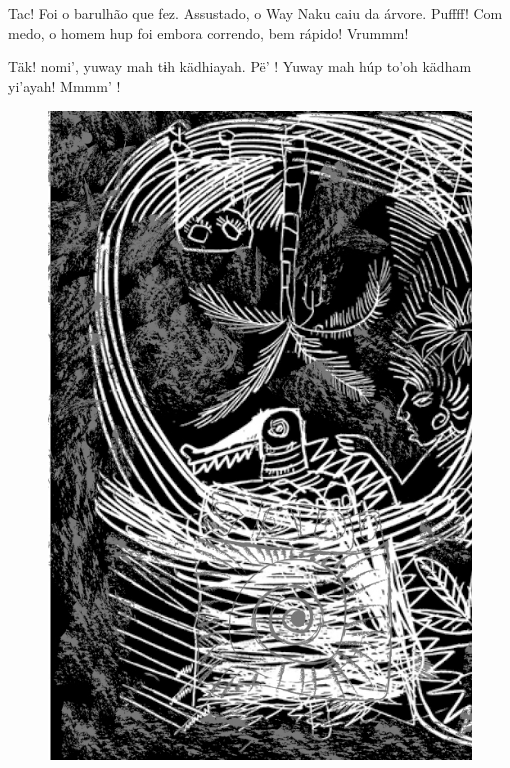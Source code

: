 \chapter*{}

\mbox{}\vspace*{\fill}

Tac! Foi o barulhão
que fez. Assustado,
o Way Naku caiu da
árvore. Puffff!
Com medo, o homem
hup foi embora
correndo, bem
rápido! Vrummm!

\bigskip

Täk! nomi’, yuway
mah tɨh kädhiayah.
Pë’ ! Yuway mah
húp to’oh kädham
yi’ayah! Mmmm’ !

\vspace*{\fill}

\begin{figure}
\vspace*{-1.2cm}
\hspace*{-2.2cm}\includegraphics[width=138mm]{./imgs/img6.jpg}
\end{figure}


